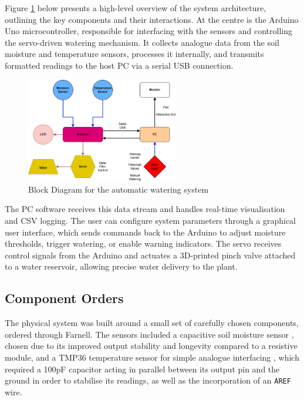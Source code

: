 \documentclass[a4paper,11pt]{article}
\begin{document}
Figure \ref{fig:Block_Diagram_for_the_automatic_watering_system} below presents a high-level overview 
of the system architecture, outlining the key components and their interactions. 
At the centre is the Arduino Uno microcontroller, responsible for interfacing with 
the sensors and controlling the servo-driven watering mechanism. 
It collects analogue data from the soil moisture and temperature sensors, 
processes it internally, and transmits formatted readings 
to the host PC via a serial USB connection.

\begin{figure}[H]
    \centering
    \includegraphics[width=0.6\textwidth]{Datalogger Block Diagram - final.png}
    \caption{Block Diagram for the automatic watering system}
    \label{fig:Block_Diagram_for_the_automatic_watering_system}
\end{figure}

The PC software receives this data stream and handles real-time visualisation
and CSV logging.
The user can configure system parameters through a graphical user interface, 
which sends commands back to the Arduino to adjust moisture thresholds, 
trigger watering, or enable warning indicators.
The servo receives control signals from the Arduino and 
actuates a 3D-printed pinch valve attached to a water reservoir, 
allowing precise water delivery to the plant. 

\subsection{Component Orders}
\label{sec:Components}
The physical system was built around a small set of carefully chosen components, 
ordered through Farnell. 
The sensors included a capacitive soil moisture sensor \cite{dfrobot}, 
chosen due to its improved output stability and longevity compared to a resistive module,
and a TMP36 temperature sensor for simple analogue interfacing \cite{tmp36} \cite{arduino_tmp36}, 
which required a 100pF capacitor acting in parallel between its output pin and the ground
in order to stabilise its readings, 
as well as the incorporation of an \texttt{AREF} wire.
\end{document}
